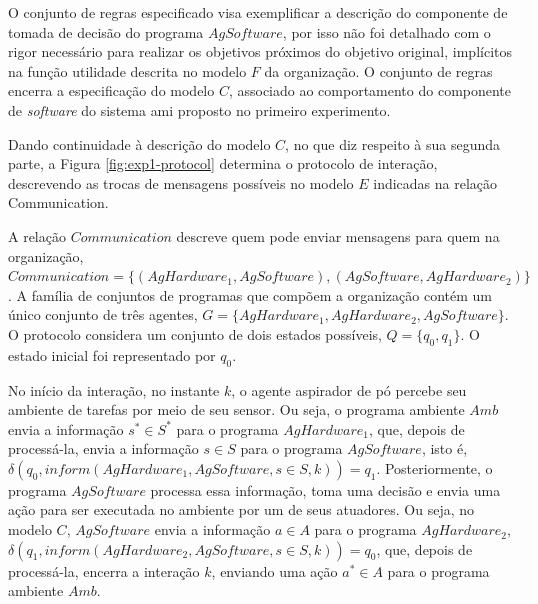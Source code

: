 O conjunto de regras especificado visa exemplificar a descrição do componente de tomada de decisão do programa $AgSoftware$, por isso não foi detalhado com o rigor necessário para realizar os objetivos próximos do objetivo original, implícitos na função utilidade descrita no modelo $F$ da organização. O conjunto de regras encerra a especificação do modelo $C$, associado ao comportamento do componente de \textit{software} do sistema \acrshort{ami} proposto no primeiro experimento.

Dando continuidade à descrição do modelo $C$, no que diz respeito à sua segunda parte, a Figura \ref{fig:exp1-protocol} determina o protocolo de interação, descrevendo as trocas de mensagens possíveis no modelo $E$ indicadas na relação Communication.

\begin{figure}[h!]
    \centering
\end{figure}

A relação $Communication$ descreve quem pode enviar mensagens para quem na organização, $Communication = \{(AgHardware_1, AgSoftware), (AgSoftware, AgHardware_2)\}$. A família de conjuntos de programas que compõem a organização contém um único conjunto de três agentes, $G = \{{AgHardware_1, AgHardware_2, AgSoftware}\}$. O protocolo considera um conjunto de dois estados possíveis, $Q = \{q_0, q_1\}$. O estado inicial foi representado por $q_0$.

No início da interação, no instante $k$, o agente aspirador de pó percebe seu ambiente de tarefas por meio de seu sensor. Ou seja, o programa ambiente $Amb$ envia a informação $s^* \in S^*$ para o programa $AgHardware_1$, que, depois de processá-la, envia a informação $s \in S$ para o programa $AgSoftware$, isto é, $\delta(q_0, inform(AgHardware_1, AgSoftware, s \in S, k)) = q_1$. Posteriormente, o programa $AgSoftware$ processa essa informação, toma uma decisão e envia uma ação para ser executada no ambiente por um de seus atuadores. Ou seja, no modelo $C$, $AgSoftware$ envia a informação $a \in A$ para o programa $AgHardware_2$, $\delta(q_1, inform(AgHardware_2, AgSoftware, s \in S, k)) = q_0$, que, depois de processá-la, encerra a interação $k$, enviando uma ação $a^* \in A$ para o programa ambiente $Amb$.

